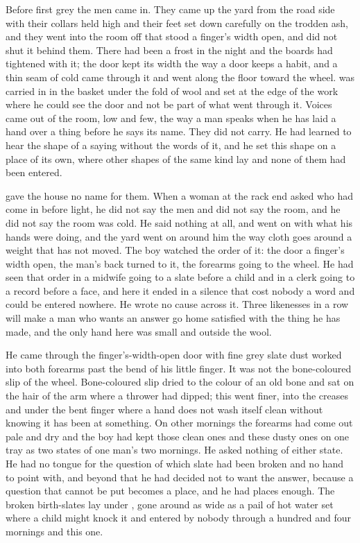 
Before first grey the men came in. They came up the yard from the road side with their collars held high and their feet set down carefully on the trodden ash, and they went into the room off  that stood a finger's width open, and did not shut it behind them. There had been a frost in the night and the boards had tightened with it; the door kept its width the way a door keeps a habit, and a thin seam of cold came through it and went along the floor toward the wheel.  was carried in in the basket under the fold of wool and set at the edge of the work where he could see the door and not be part of what went through it. Voices came out of the room, low and few, the way a man speaks when he has laid a hand over a thing before he says its name. They did not carry. He had learned to hear the shape of a saying without the words of it, and he set this shape on a place of its own, where other shapes of the same kind lay and none of them had been entered.

 gave the house no name for them. When a woman at the rack end asked who had come in before light, he did not say the men and did not say the room, and he did not say the room was cold. He said nothing at all, and went on with what his hands were doing, and the yard went on around him the way cloth goes around a weight that has not moved. The boy watched the order of it: the door a finger's width open, the man's back turned to it, the forearms going to the wheel. He had seen that order in a midwife going to a slate before a child and in a clerk going to a record before a face, and here it ended in a silence that cost nobody a word and could be entered nowhere. He wrote no cause across it. Three likenesses in a row will make a man who wants an answer go home satisfied with the thing he has made, and the only hand here was small and outside the wool.

He came through the finger's-width-open door with fine grey slate dust worked into both forearms past the bend of his little finger. It was not the bone-coloured slip of the wheel. Bone-coloured slip dried to the colour of an old bone and sat on the hair of the arm where a thrower had dipped; this went finer, into the creases and under the bent finger where a hand does not wash itself clean without knowing it has been at something. On other mornings the forearms had come out pale and dry and the boy had kept those clean ones and these dusty ones on one tray as two states of one man's two mornings. He asked nothing of either state. He had no tongue for the question of which slate had been broken and no hand to point with, and beyond that he had decided not to want the answer, because a question that cannot be put becomes a place, and he had places enough. The broken birth-slates lay under , gone around as wide as a pail of hot water set where a child might knock it and entered by nobody through a hundred and four mornings and this one.

